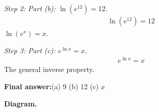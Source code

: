 \documentclass[11pt]{article}
\begin{document}
\textit{Step 2: Part (b): \( \ln(e^{12}) = 12 \).}
\[\begin{gathered}
\ln(e^{12}) = 12
\end{gathered}\]
\( \ln(e^x) = x \).

\textit{Step 3: Part (c): \( e^{\ln x} = x \).}
\[\begin{gathered}
e^{\ln x} = x
\end{gathered}\]
The general inverse property.

\begin{answerbox}
\textbf{Final answer:}\quad (a) 9 \quad  (b) 12 \quad  (c) \(\displaystyle  x \)
\end{answerbox}
\textbf{Diagram.}

\begin{center}
\end{center}
\end{document}
